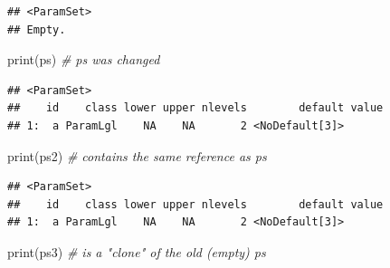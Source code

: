 \documentclass[
]{scrbook}
\newenvironment{Shaded}{\begin{snugshade}}{\end{snugshade}}
\newcommand{\AttributeTok}[1]{\textcolor[rgb]{0.77,0.63,0.00}{#1}}
\newcommand{\CommentTok}[1]{\textcolor[rgb]{0.56,0.35,0.01}{\textit{#1}}}
\newcommand{\ConstantTok}[1]{\textcolor[rgb]{0.00,0.00,0.00}{#1}}
\newcommand{\FunctionTok}[1]{\textcolor[rgb]{0.00,0.00,0.00}{#1}}
\newcommand{\NormalTok}[1]{#1}
\newcommand{\OtherTok}[1]{\textcolor[rgb]{0.56,0.35,0.01}{#1}}
\newcommand{\SpecialCharTok}[1]{\textcolor[rgb]{0.00,0.00,0.00}{#1}}
\newcommand{\StringTok}[1]{\textcolor[rgb]{0.31,0.60,0.02}{#1}}
\renewenvironment{Shaded} {\begin{snugshade}\small} {\end{snugshade}}
\begin{document}
\begin{Shaded}
\end{Shaded}

\begin{verbatim}
## <ParamSet>
## Empty.
\end{verbatim}

\begin{Shaded}
\end{Shaded}

\begin{Shaded}
\begin{Highlighting}[]
\FunctionTok{print}\NormalTok{(ps)  }\CommentTok{\# ps was changed}
\end{Highlighting}
\end{Shaded}

\begin{verbatim}
## <ParamSet>
##    id    class lower upper nlevels        default value
## 1:  a ParamLgl    NA    NA       2 <NoDefault[3]>
\end{verbatim}

\begin{Shaded}
\begin{Highlighting}[]
\FunctionTok{print}\NormalTok{(ps2) }\CommentTok{\# contains the same reference as ps}
\end{Highlighting}
\end{Shaded}

\begin{verbatim}
## <ParamSet>
##    id    class lower upper nlevels        default value
## 1:  a ParamLgl    NA    NA       2 <NoDefault[3]>
\end{verbatim}

\begin{Shaded}
\begin{Highlighting}[]
\FunctionTok{print}\NormalTok{(ps3) }\CommentTok{\# is a "clone" of the old (empty) ps}
\end{Highlighting}
\end{Shaded}
\end{document}
